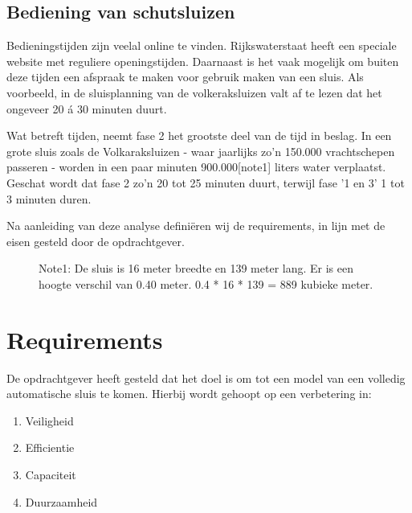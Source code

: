 \documentclass{article} %
\begin{document}
\subsection{Bediening van schutsluizen}
Bedieningstijden zijn veelal online te vinden. Rijkswaterstaat heeft een speciale website met reguliere openingstijden. Daarnaast is het vaak mogelijk om buiten deze tijden een afspraak te maken voor gebruik maken van een sluis. Als voorbeeld, in de sluisplanning van de volkeraksluizen valt af te lezen dat het ongeveer 20 á 30 minuten duurt. \cite{vaarweginformatie, volkeraksluizen, SluisplanningVolkeraksluizen} \par 

Wat betreft tijden, neemt fase 2 het grootste deel van de tijd in beslag. In een grote sluis zoals de Volkaraksluizen - waar jaarlijks zo’n 150.000 vrachtschepen passeren - worden in een paar minuten 900.000[note1] liters water verplaatst. \cite{WaterkaartVolkeraksluizen} Geschat wordt dat fase 2 zo’n 20 tot 25 minuten duurt, terwijl fase '1 en 3' 1 tot 3 minuten duren. \par

Na aanleiding van deze analyse definiëren wij de requirements, in lijn met de eisen gesteld door de opdrachtgever. \par


\begin{figure}[b]
    Note1: De sluis is 16 meter breedte en 139 meter lang. Er is een hoogte verschil van 0.40 meter. 0.4 * 16 * 139 = 889 kubieke meter.
\end{figure}
\newpage




\section{Requirements}
De opdrachtgever heeft gesteld dat het doel is om tot een model van een volledig automatische sluis te komen. Hierbij wordt gehoopt op een verbetering in:
\begin{enumerate}
    \item Veiligheid
    \item Efficientie
    \item Capaciteit
    \item Duurzaamheid
\end{enumerate}
\end{document}
